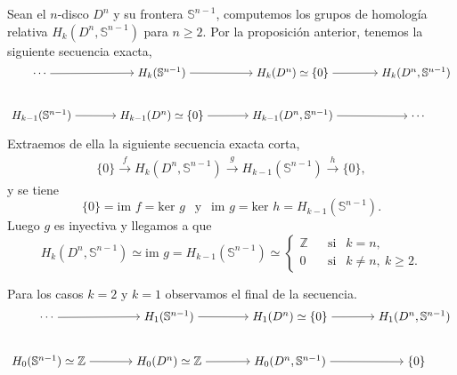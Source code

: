 \begin{example}
\label{hom_relat_disco}
Sean el $n$-disco $D^n$ y su frontera $\mathbb{S}^{n-1}$, computemos los grupos de homología relativa $H_k(D^n,\mathbb{S}^{n-1})$ para $n\ge 2$. Por la proposición anterior, tenemos la siguiente secuencia exacta,
\[
\begin{tikzcd}[
  column sep=large,
  row sep=large,
  every cell/.style={math mode},
  remember picture
]
\cdots ~ \arrow[r] &
 ~ H_k(\mathbb{S}^{n-1})~  \arrow[r] &
~ H_k(D^n)\simeq \{0\} ~ \arrow[r] &
|[alias=topend]| ~H_k(D^n,\mathbb{S}^{n-1})~ \\
|[alias=botstart]| ~H_{k-1}(\mathbb{S}^{n-1})~ \arrow[r] &
~H_{k-1}(D^n)\simeq \{0\}~ \arrow[r] &
~H_{k-1}(D^n,\mathbb{S}^{n-1})~ \arrow[r] &
~\cdots
\end{tikzcd}
\]

Extraemos de ella la siguiente secuencia exacta corta,
\begin{align*}
    \{0\}\overset{f}{\longrightarrow} H_k(D^n,\mathbb{S}^{n-1}) \overset{g}{\longrightarrow} H_{k-1}(\mathbb{S}^{n-1}) \overset{h}{\longrightarrow} \{0\},
\end{align*}
y se tiene
\begin{equation*}
    \{0\} = \text{im }f = \text{ker }g ~~\text{ y }~~ \text{im }g = \text{ker }h = H_{k-1}(\mathbb{S}^{n-1}).
\end{equation*}
Luego $g$ es inyectiva y llegamos a que
\begin{equation*}
    H_k(D^n,\mathbb{S}^{n-1}) \simeq \text{im }g = H_{k-1}(\mathbb{S}^{n-1}) \simeq
    \begin{cases}
        \mathbb{Z} &~~\text{ si }~~ k=n,\\
        0 &~~\text{ si }~~k\neq n, ~k\ge 2.
    \end{cases}
\end{equation*}

\newpage
Para los casos $k=2$ y $k=1$ observamos el final de la secuencia.
\[
\begin{tikzcd}[
  column sep=large,
  row sep=large,
  every cell/.style={math mode},
  remember picture
]
\cdots ~ \arrow[r] &
 ~ H_1(\mathbb{S}^{n-1})~  \arrow[r] &
~ H_1(D^n)\simeq \{0\} ~ \arrow[r] &
|[alias=topend]| ~H_1(D^n,\mathbb{S}^{n-1})~ \\
|[alias=botstart]| ~H_{0}(\mathbb{S}^{n-1})\simeq \mathbb{Z}~ \arrow[r] &
~H_{0}(D^n)\simeq \mathbb{Z}~ \arrow[r] &
~H_{0}(D^n,\mathbb{S}^{n-1})~ \arrow[r] &
~\{0\}
\end{tikzcd}
\]


\end{example}

